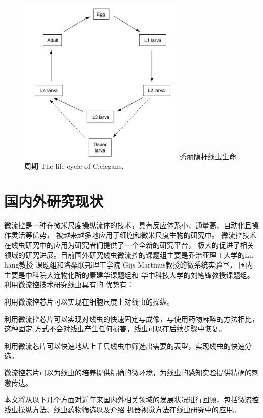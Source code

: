 	\begin{figure}[h]
	  \centering
	  \includegraphics[width=8cm]{figure/chap1/lifecycle.jpg}
	  \bicaption
		{秀丽隐杆线虫生命周期}
		{The life cycle of C.elegans.}
	  \label{fig:lifecycle}
	\end{figure}
	
\section{国内外研究现状}
\label{sec:intro:analog}
	微流控是一种在微米尺度操纵流体的技术，具有反应体系小、通量高、自动化且操作灵活等优势，
	被越来越多地应用于细胞和微米尺度生物的研究中。
	微流控技术在线虫研究中的应用为研究者们提供了一个全新的研究平台，
	极大的促进了相关领域的研究进展。目前国外研究线虫微流控的课题组主要是乔治亚理工大学的Lu hang教授
	课题组和洛桑联邦理工学院
	Gijs Martinus教授的微系统实验室，
	国内主要是中科院大连物化所的秦建华课题组和
	华中科技大学的刘笔锋教授课题组。利用微流控技术研究线虫具有的
	优势有：\begin{enumerate*}[label=\arabic*.]
	\item 利用微流控芯片可以实现在细胞尺度上对线虫的操纵。\quad
	\item 利用微流控芯片可以实现对线虫的快速固定与成像，与使用药物麻醉的方法相比，这种固定
		方式不会对线虫产生任何损害，线虫可以在后续步骤中恢复。\quad
	\item 利用微流芯片可以快速地从上千只线虫中筛选出需要的表型，实现线虫的快速分选。\quad
	\item 微流控芯片可以为线虫的培养提供精确的微环境，为线虫的感知实验提供精确的刺激传达。\quad
\end{enumerate*}
	本文将从以下几个方面对近年来国内外相关领域的发展状况进行回顾，包括微流控线虫操纵方法、线虫药物筛选以及介绍
	机器视觉方法在线虫研究中的应用。
